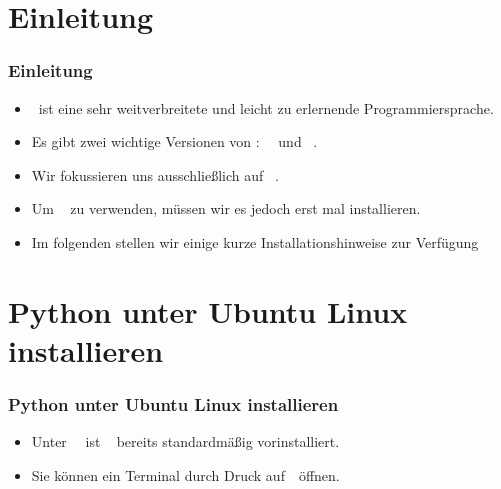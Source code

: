 \documentclass[aspectratio=169,mathserif,notheorems]{beamer}%
\subtitle{3.~Python Installieren}%
\begin{document}
%
%
\startPresentation%
%
\section{Einleitung}%
%
\begin{frame}%
\frametitle{Einleitung}%
\begin{itemize}%
\item \python\ ist eine sehr weitverbreitete\cite{CBST2024LOHPPTDDSAMLA,B2023G2GLS} und leicht zu erlernende\cite{GPBS2006WCTIPIHSUP,VR1999CPFERPASEFTPOT} Programmiersprache.%
\item<2-> Es gibt zwei wichtige Versionen von \python:~\python~ und \python~.%
\item<3-> Wir fokussieren uns ausschließlich auf \python~.%
\item<4-> Um \python~ zu verwenden, müssen wir es jedoch erst mal installieren.%
\item<5-> Im folgenden stellen wir einige kurze Installationshinweise zur Verfügung
\end{itemize}%
\end{frame}%
%
\section{Python unter Ubuntu Linux installieren}%
%
\begin{frame}[t]%
\frametitle{Python unter Ubuntu Linux installieren}%
\begin{itemize}%
\item Unter \ubuntu\ \linux\ ist \python~ bereits standardmäßig vorinstalliert.%
\item<2-> Sie können ein Terminal\cite{B2022ELATCL} durch Druck auf~\ubuntuTerminal\ öffnen.%
\end{itemize}%
%
%
\end{frame}%
%
\end{document}
